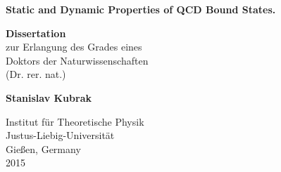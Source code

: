 \documentclass[a4paper,twoside,12pt]{book}
\begin{document}
\thispagestyle{empty}
\begin{titlepage}
    \begin{center}
    	\centering
        \vspace{1cm}
        \textbf{{\Large Static and Dynamic Properties of QCD Bound States.}}
        
        
        \vspace{3cm}
        \textbf{{\Large Dissertation}}\\
		zur Erlangung des Grades eines\\
		Doktors der Naturwissenschaften\\
		(Dr. rer. nat.)
        
        \vspace{3cm}
        \textbf{{\Large Stanislav Kubrak}}
        
        \vfill
                	
        \vspace{1.5cm}
                
        Institut f{\"u}r Theoretische Physik\\
        Justus-Liebig-Universit{\"a}t\\
        Gie{\ss}en, Germany\\
        2015 \\
        \vspace{1cm}
        
    \end{center}
\end{titlepage}




{\singlespacing
\tableofcontents
}







%

\begin{appendices}



\end{appendices}
%

{}
 

\end{document}
